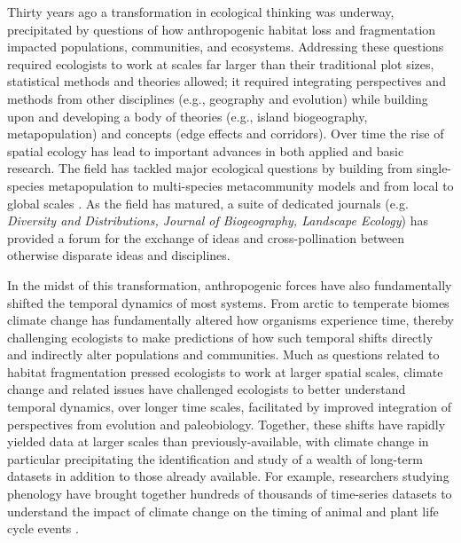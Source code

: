 \documentclass[11pt,a4paper,oneside]{article}
\begin{document}
Thirty years ago a transformation in ecological thinking was underway, precipitated by questions of how anthropogenic habitat loss and fragmentation impacted populations, communities, and ecosystems. Addressing these questions required ecologists to work at scales far larger than their traditional plot sizes, statistical methods and theories allowed; it required integrating perspectives and methods from other disciplines (e.g., geography and evolution) while building upon and developing a body of theories (e.g., island biogeography, metapopulation) and concepts (edge effects and corridors). Over time the rise of spatial ecology has lead to important advances in both applied and basic research. The field has tackled major ecological questions by building from single-species metapopulation to multi-species metacommunity models \citep{Pillai2011} and from local to global scales \citep{bell2001}. As the field has matured, a suite of dedicated journals  (e.g. \emph{Diversity and Distributions, Journal of Biogeography, Landscape Ecology}) has provided a forum for the exchange of ideas and cross-pollination between otherwise disparate ideas and disciplines. %

In the midst of this transformation, anthropogenic forces have also fundamentally shifted the temporal dynamics of most systems. From arctic to temperate biomes climate change has fundamentally altered how organisms experience time, thereby challenging ecologists to make predictions of how such temporal shifts directly and indirectly alter populations and communities. Much as questions related to habitat fragmentation pressed ecologists to work at larger spatial scales, climate change and related issues have challenged ecologists to better understand temporal dynamics, over longer time scales, facilitated by improved integration of perspectives from evolution and paleobiology. Together, these shifts have rapidly yielded data at larger scales than previously-available, with climate change in particular precipitating the identification and study of a wealth of long-term datasets in addition to those already available. For example, researchers studying phenology have brought together hundreds of thousands of time-series datasets to understand the impact of climate change on the timing of animal and plant life cycle events \citep{Menzel:2006sq,Parmesan:2007tv}.\\
\end{document}
